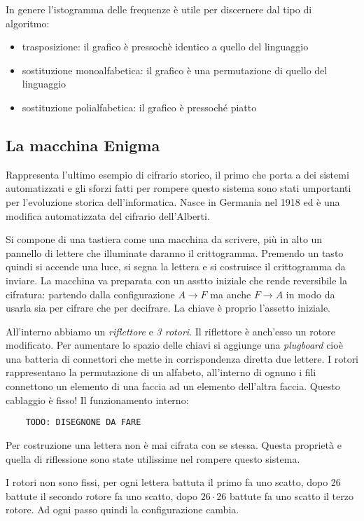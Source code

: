 In genere l'istogramma delle frequenze è utile per discernere dal tipo di algoritmo:
\begin{itemize}
    \item trasposizione: il grafico è pressochè identico a quello del linguaggio
    \item sostituzione monoalfabetica: il grafico è una permutazione di quello del linguaggio
    \item sostituzione polialfabetica: il grafico è pressoché piatto
\end{itemize}

\subsection{La macchina Enigma}
Rappresenta l'ultimo esempio di cifrario storico, il primo che porta a dei sistemi automatizzati e gli sforzi fatti per rompere questo sistema sono stati umportanti per l'evoluzione storica dell'informatica. Nasce in Germania nel 1918 ed è una modifica automatizzata del cifrario dell'Alberti.

Si compone di una tastiera come una macchina da scrivere, più in alto un pannello di lettere che illuminate daranno il crittogramma. Premendo un tasto quindi si accende una luce, si segna la lettera e si costruisce il crittogramma da inviare. La macchina va preparata con un asstto iniziale che rende reversibile la cifratura: partendo dalla configurazione $A \xrightarrow{} F$ ma anche $F \xrightarrow{} A$ in modo da usarla sia per cifrare che per decifrare. La chiave è proprio l'assetto iniziale.

All'interno abbiamo un \emph{riflettore} e \emph{3 rotori}. Il riflettore è anch'esso un rotore modificato. Per aumentare lo spazio delle chiavi si aggiunge una \emph{plugboard} cioè una batteria di connettori che mette in corrispondenza diretta due lettere. I rotori rappresentano la permutazione di un alfabeto, all'interno di ognuno i fili connettono un elemento di una faccia ad un elemento dell'altra faccia. Questo cablaggio è fisso!
Il funzionamento interno:

\begin{verbatim}
    TODO: DISEGNONE DA FARE
\end{verbatim}

Per costruzione una lettera non è mai cifrata con se stessa. Questa proprietà e quella di riflessione sono state utilissime nel rompere questo sistema.

I rotori non sono fissi, per ogni lettera battuta il primo fa uno scatto, dopo 26 battute il secondo rotore fa uno scatto, dopo $26 \cdot 26$ battute fa uno scatto il terzo rotore. Ad ogni passo quindi la configurazione cambia.

